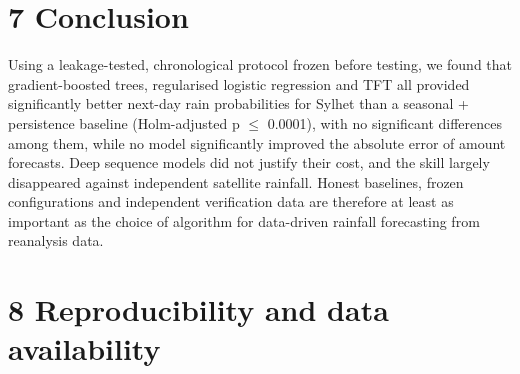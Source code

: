 \documentclass[
]{article}
\begin{document}
\hypertarget{conclusion}{%
\section{7 Conclusion}\label{conclusion}}

Using a leakage-tested, chronological protocol frozen before testing, we found that gradient-boosted trees, regularised logistic regression and TFT all provided significantly better next-day rain probabilities for Sylhet than a seasonal + persistence baseline (Holm-adjusted p $\le$ 0.0001), with no significant differences among them,  %
while no model significantly improved the absolute error of amount forecasts. Deep sequence models did not justify their cost, and the skill largely disappeared against independent satellite rainfall. Honest baselines, frozen configurations and independent verification data are therefore at least as important as the choice of algorithm for data-driven rainfall forecasting from reanalysis data.

\hypertarget{reproducibility-and-data-availability}{%
\section{8 Reproducibility and data availability}\label{reproducibility-and-data-availability}}
\end{document}
